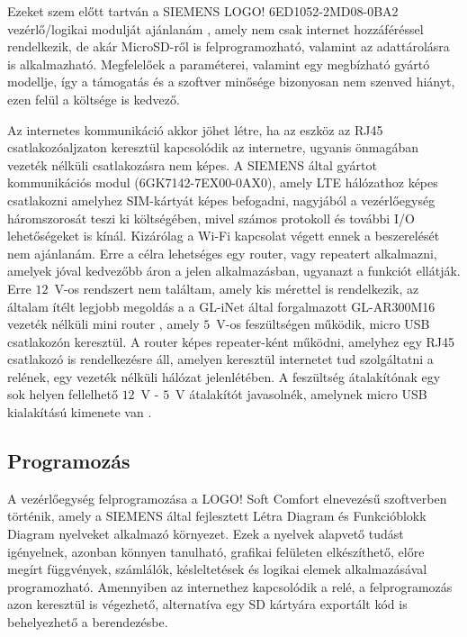 Ezeket szem előtt tartván a SIEMENS LOGO! 6ED1052-2MD08-0BA2 vezérlő/logikai modulját ajánlanám \cite{siemens_logo_adatlap}, amely nem csak internet hozzáféréssel rendelkezik, de akár MicroSD-ről is felprogramozható, valamint az adattárolásra is alkalmazható. Megfelelőek a paraméterei, valamint egy megbízható gyártó modellje, így a támogatás és a szoftver minősége bizonyosan nem szenved hiányt, ezen felül a költsége is kedvező.

Az internetes kommunikáció akkor jöhet létre, ha az eszköz az RJ45 csatlakozóaljzaton keresztül kapcsolódik az internetre, ugyanis önmagában vezeték nélküli csatlakozásra nem képes. A SIEMENS által gyártot kommunikációs modul (6GK7142-7EX00-0AX0), amely LTE hálózathoz képes csatlakozni amelyhez SIM-kártyát képes befogadni, nagyjából a vezérlőegység háromszorosát teszi ki költségében, mivel számos protokoll és további I/O lehetőségeket is kínál. Kizárólag a Wi-Fi kapcsolat végett ennek a beszerelését nem ajánlanám. Erre a célra lehetséges egy router, vagy repeatert alkalmazni, amelyek jóval kedvezőbb áron a jelen alkalmazásban, ugyanazt a funkciót ellátják. Erre $12$~V-os rendszert nem találtam, amely kis mérettel is rendelkezik, az általam ítélt legjobb megoldás a a GL-iNet által forgalmazott GL-AR300M16 vezeték nélküli mini router \cite{router}, amely $5$~V-os feszültségen működik, micro USB csatlakozón keresztül. A router képes repeater-ként működni, amelyhez egy RJ45 csatlakozó is rendelkezésre áll, amelyen keresztül internetet tud szolgáltatni a relének, egy vezeték nélküli hálózat jelenlétében. A feszültség átalakítónak egy sok helyen fellelhető $12$~V - $5$~V átalakítót javasolnék, amelynek micro USB kialakítású kimenete van \cite{fesz_atalak}.
\subsection{Programozás}

A vezérlőegység felprogramozása a LOGO! Soft Comfort elnevezésű szoftverben történik, amely a SIEMENS által fejlesztett Létra Diagram és Funkcióblokk Diagram nyelveket alkalmazó környezet. Ezek a nyelvek alapvető tudást igényelnek, azonban könnyen tanulható, grafikai felületen elkészíthető, előre megírt függvények, számlálók, késleltetések és logikai elemek alkalmazásával programozható. Amennyiben az internethez kapcsolódik a relé, a felprogramozás azon keresztül is végezhető, alternatíva egy SD kártyára exportált kód is behelyezhető a berendezésbe. 

